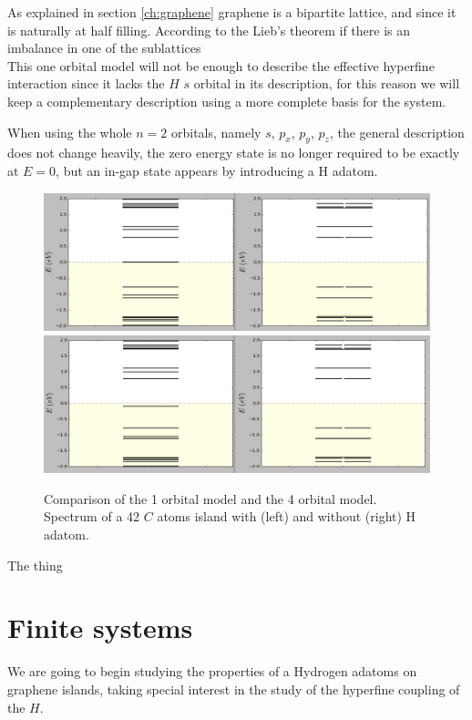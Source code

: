 As explained in section \ref{ch:graphene}  graphene is a bipartite lattice, and since it is naturally at half filling. According to the Lieb's theorem if there is an imbalance in one of the sublattices \\

This one orbital model will not be enough to describe the effective hyperfine interaction since it lacks the $H$ $s$ orbital in its description, for this reason we will keep a complementary description using a more complete basis for the system.

When using the whole $n=2$ orbitals, namely $s$, $p_x$, $p_y$, $p_z$, the general description does not change heavily, the zero energy state is no longer required to be exactly at $E=0$, but an in-gap state appears by introducing a H adatom.
\begin{figure}[h!]
\centering
\includegraphics{chapter05/figures/spectrum1orb.png}
\includegraphics{chapter05/figures/spectrum4orb.png}
\vspace{-5pt}
\caption{Comparison of the 1 orbital model and the 4 orbital model. Spectrum of a 42 $C$ atoms island with (left) and without (right) H adatom.}
\label{Label}
\end{figure}
\FloatBarrier
The thing


\section{Finite systems}
We are going to begin studying the properties of a Hydrogen adatoms on graphene islands, taking special interest in the study of the hyperfine coupling of the $H$.

